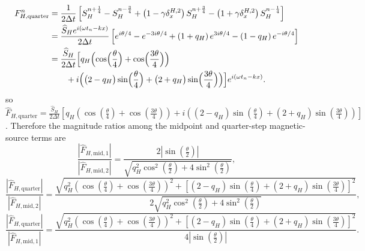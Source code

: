 \documentclass{article}
\numberwithin{figure}{section}
\begin{document}
\begin{equation}
    \begin{aligned} F_{H,\mathrm{quarter}}^n & =\frac{1}{2\Delta t}\left[S_H^{n+\frac{1}{4}}-S_H^{n-\frac{3}{4}}+\left(1-\gamma\delta_x^{H,2}\right)S_H^{n+\frac{3}{4}}-\left(1+\gamma\delta_x^{H,2}\right)S_H^{n-\frac{1}{4}}\right] \\
                                         & =\frac{\widehat{S}_H e^{i(\omega t_n-kx)}}{2\Delta t}\left[e^{i\theta/4}-e^{-3i\theta/4}+\left(1+q_H\right)e^{3i\theta/4}-\left(1-q_H\right)e^{-i\theta/4}\right]                        \\
                                         & =\frac{\widehat{S}_H}{2\Delta t}\Bigl[
        q_H\Bigl(\cos\Bigl(\frac{\theta}{4}\Bigr)+\cos\Bigl(\frac{3\theta}{4}\Bigr)\Bigr) \\
                                         & \qquad +i\Bigl(\bigl(2-q_H\bigr)\sin\Bigl(\frac{\theta}{4}\Bigr)+\bigl(2+q_H\bigr)\sin\Bigl(\frac{3\theta}{4}\Bigr)\Bigr)
        \Bigr]e^{i(\omega t_n-kx)}.
    \end{aligned} \label{eq:dir2-hsource-quarter-source-amplitude}
\end{equation}
so $\widehat{F}_{H,\mathrm{quarter}}=\frac{\widehat{S}_H}{2\Delta t}\left[q_H\left(\cos\left(\frac{\theta}{4}\right)+\cos\left(\frac{3\theta}{4}\right)\right)+i\left(\left(2-q_H\right)\sin\left(\frac{\theta}{4}\right)+\left(2+q_H\right)\sin\left(\frac{3\theta}{4}\right)\right)\right]$.
Therefore the magnitude ratios among the midpoint and quarter-step magnetic-source terms are
\begin{equation}
    \frac{\left|\widehat{F}_{H,\mathrm{mid,1}}\right|}{\left|\widehat{F}_{H,\mathrm{mid,2}}\right|}=\frac{2\left|\sin\left(\frac{\theta}{2}\right)\right|}{\sqrt{q_H^{2}\cos^{2}\left(\frac{\theta}{2}\right)+4\sin^{2}\left(\frac{\theta}{2}\right)}}, \label{eq:dir2-hsource-source-magnitude-ratio-mid}
\end{equation}
\begin{equation}
    \frac{\left|\widehat{F}_{H,\mathrm{quarter}}\right|}{\left|\widehat{F}_{H,\mathrm{mid,2}}\right|}=\frac{\sqrt{q_H^{2}\left(\cos\left(\frac{\theta}{4}\right)+\cos\left(\frac{3\theta}{4}\right)\right)^{2}+\left[\left(2-q_H\right)\sin\left(\frac{\theta}{4}\right)+\left(2+q_H\right)\sin\left(\frac{3\theta}{4}\right)\right]^{2}}}{2\sqrt{q_H^{2}\cos^{2}\left(\frac{\theta}{2}\right)+4\sin^{2}\left(\frac{\theta}{2}\right)}}, \label{eq:dir2-hsource-source-magnitude-ratio-both}
\end{equation}
\begin{equation}
    \frac{\left|\widehat{F}_{H,\mathrm{quarter}}\right|}{\left|\widehat{F}_{H,\mathrm{mid,1}}\right|}=\frac{\sqrt{q_H^{2}\left(\cos\left(\frac{\theta}{4}\right)+\cos\left(\frac{3\theta}{4}\right)\right)^{2}+\left[\left(2-q_H\right)\sin\left(\frac{\theta}{4}\right)+\left(2+q_H\right)\sin\left(\frac{3\theta}{4}\right)\right]^{2}}}{4\left|\sin\left(\frac{\theta}{2}\right)\right|}. \label{eq:dir2-hsource-source-magnitude-ratio}
\end{equation}
\end{document}
